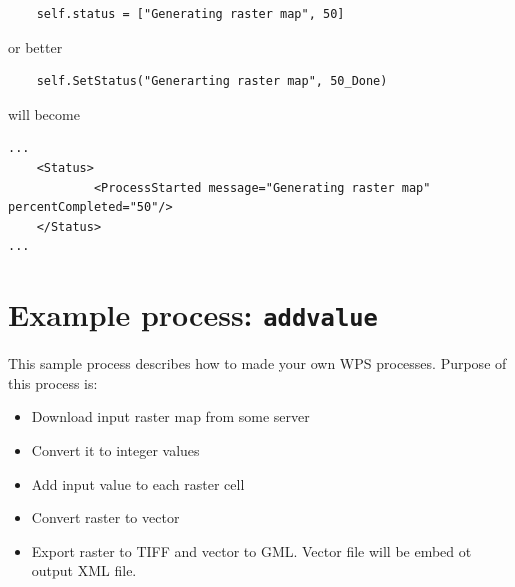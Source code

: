 \documentclass[a4paper,11pt]{article}
\begin{document}
\begin{verbatim}
    self.status = ["Generating raster map", 50]
\end{verbatim}
or better
\begin{verbatim}
    self.SetStatus("Generarting raster map", 50_Done)
\end{verbatim}

will become

\begin{verbatim}
...
    <Status>
            <ProcessStarted message="Generating raster map" percentCompleted="50"/>
    </Status>
...
\end{verbatim}

\appendix

    \section{Example process: \texttt{addvalue}}
    This sample process describes how to made your own WPS processes. Purpose of this process is:
    \begin{itemize}
    \item  Download input raster map from some server
    \item  Convert it to integer values
    \item  Add input value to each raster cell
    \item  Convert raster to vector
    \item  Export raster to TIFF and vector to GML. Vector file will be embed ot output XML file.
    \end{itemize}
\end{document}
